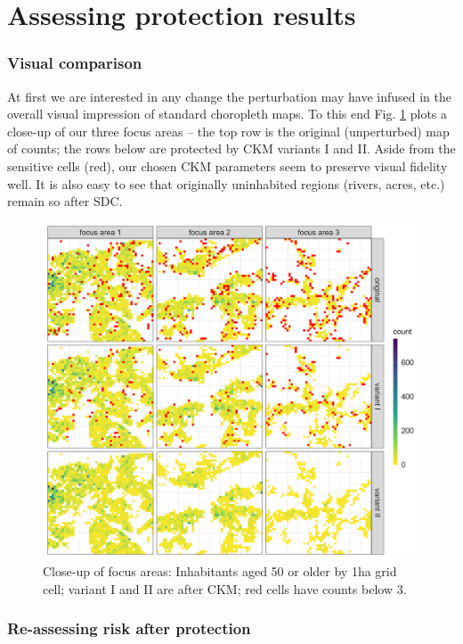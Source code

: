 \section{Assessing protection results} \label{sec:csCKM_il}

\subsubsection{Visual comparison}

At first we are interested in any change the perturbation may have infused in the overall visual impression of standard choropleth maps. To this end Fig. \ref{fig:cs_rckm_fa} plots a close-up of our three focus areas -- the top row is the original (unperturbed) map of counts; the rows below are protected by CKM variants I and II. Aside from the sensitive cells (red), our chosen CKM parameters seem to preserve visual fidelity well. It is also easy to see that originally uninhabited regions (rivers, acres, etc.) remain so after SDC.

\begin{figure}[H]
    \centering
    \includegraphics[width = \linewidth]{figures/CaseStudy_CKM/r_ckm_fa.png}
    \caption{Close-up of focus areas: Inhabitants aged 50 or older by 1ha grid cell; variant I and II are after CKM; red cells have counts below 3.}
    \label{fig:cs_rckm_fa}
\end{figure}

\subsubsection{Re-assessing risk after protection}

